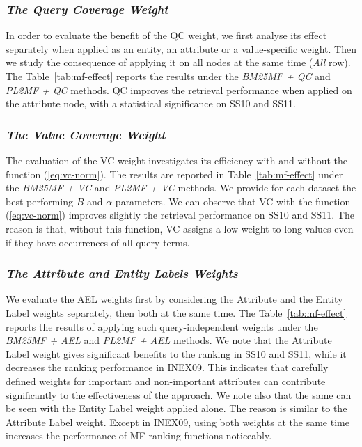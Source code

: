 \subsubsection{\emph{The Query Coverage Weight}}
\label{sec:qc-weight-effect}

In order to evaluate the benefit of the QC weight, we first analyse its effect separately when applied as an entity, an attribute or a value-specific weight. Then we study the consequence of applying it on all nodes at the same time (\emph{All} row). The Table~\ref{tab:mf-effect} reports the results under the \emph{BM25MF + QC} and \emph{PL2MF + QC} methods. QC improves the retrieval performance when applied on the attribute node, with a statistical significance on SS10 and SS11.

\subsubsection{\emph{The Value Coverage Weight}}
\label{sec:vc-weight-effect}

The evaluation of the VC weight investigates its efficiency with and without the function (\ref{eq:vc-norm}). The results are reported in Table~\ref{tab:mf-effect} under the \emph{BM25MF + VC} and \emph{PL2MF + VC} methods. We provide for each dataset the best performing $B$ and $\alpha$ parameters. We can observe that VC with the function (\ref{eq:vc-norm}) improves slightly the retrieval performance on SS10 and SS11. The reason is that, without this function, VC assigns a low weight to long values even if they have occurrences of all query terms.

\subsubsection{\emph{The Attribute and Entity Labels Weights}}
\label{sec:ael-weight-effect}

We evaluate the AEL weights first by considering the Attribute and the Entity Label weights separately, then both at the same time. The Table~\ref{tab:mf-effect} reports the results of applying such query-independent weights under the \emph{BM25MF + AEL} and \emph{PL2MF + AEL} methods.
We note that the Attribute Label weight gives significant benefits to the ranking in SS10 and SS11, while it decreases the ranking performance in INEX09. This indicates that carefully defined weights for important and non-important attributes can contribute significantly to the effectiveness of the approach. We note also that the same can be seen with the Entity Label weight applied alone. The reason is similar to the Attribute Label weight.
Except in INEX09, using both weights at the same time increases the performance of MF ranking functions noticeably.

